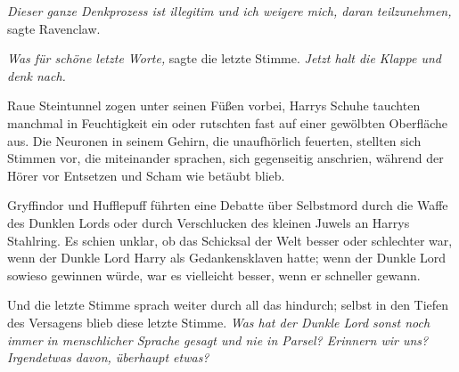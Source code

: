 \emph{Dieser ganze Denkprozess ist illegitim und ich weigere mich, daran teilzunehmen,} sagte Ravenclaw.

\emph{Was für schöne letzte Worte,} sagte die letzte Stimme. \emph{Jetzt halt die Klappe und denk nach.}

Raue Steintunnel zogen unter seinen Füßen vorbei, Harrys Schuhe tauchten manchmal in Feuchtigkeit ein oder rutschten fast auf einer gewölbten Oberfläche aus. Die Neuronen in seinem Gehirn, die unaufhörlich feuerten, stellten sich Stimmen vor, die miteinander sprachen, sich gegenseitig anschrien, während der Hörer vor Entsetzen und Scham wie betäubt blieb.

Gryffindor und Hufflepuff führten eine Debatte über Selbstmord durch die Waffe des Dunklen Lords oder durch Verschlucken des kleinen Juwels an Harrys Stahlring. Es schien unklar, ob das Schicksal der Welt besser oder schlechter war, wenn der Dunkle Lord Harry als Gedankensklaven hatte; wenn der Dunkle Lord sowieso gewinnen würde, war es vielleicht besser, wenn er schneller gewann.

Und die letzte Stimme sprach weiter durch all das hindurch; selbst in den Tiefen des Versagens blieb diese letzte Stimme.
\emph{Was hat der Dunkle Lord sonst noch immer in menschlicher Sprache gesagt und nie in Parsel? Erinnern wir uns? Irgendetwas davon, überhaupt etwas?}

